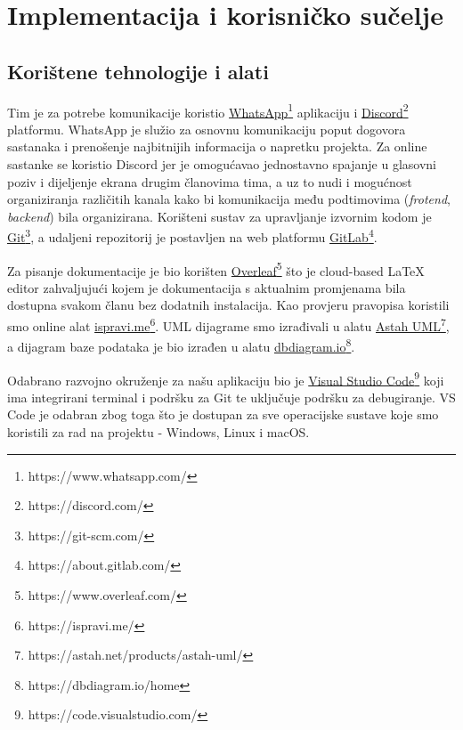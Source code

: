 \chapter{Implementacija i korisničko sučelje}
		
		
		\section{Korištene tehnologije i alati}
		
			 
			 Tim je za potrebe komunikacije koristio \underline{WhatsApp}\footnote{https://www.whatsapp.com/} aplikaciju i \underline{Discord}\footnote{https://discord.com/} platformu. WhatsApp je služio za osnovnu komunikaciju poput dogovora sastanaka i prenošenje najbitnijih informacija o napretku projekta. Za online sastanke se koristio Discord jer je omogućavao jednostavno spajanje u glasovni poziv i dijeljenje ekrana drugim članovima tima, a uz to nudi i mogućnost organiziranja različitih kanala kako bi komunikacija među podtimovima (\textit{frotend}, \textit{backend}) bila organizirana. Korišteni sustav za upravljanje izvornim kodom je \underline{Git}\footnote{https://git-scm.com/}, a udaljeni repozitorij je postavljen na web platformu \underline{GitLab}\footnote{https://about.gitlab.com/}. \par
			 
			 Za pisanje dokumentacije je bio korišten \underline{Overleaf}\footnote{https://www.overleaf.com/} što je cloud-based LaTeX editor zahvaljujući kojem je dokumentacija s aktualnim promjenama bila dostupna svakom članu bez dodatnih instalacija. Kao provjeru pravopisa koristili smo online alat \underline{ispravi.me}\footnote{https://ispravi.me/}. UML dijagrame smo izrađivali u alatu \underline{Astah UML}\footnote{https://astah.net/products/astah-uml/}, a dijagram baze podataka je bio izrađen u alatu \underline{dbdiagram.io}\footnote{https://dbdiagram.io/home}. \par
			 
			 Odabrano razvojno okruženje za našu aplikaciju bio je \underline{Visual Studio Code}\footnote{https://code.visualstudio.com/} koji ima integrirani terminal i podršku za Git te uključuje podršku za debugiranje. VS Code je odabran zbog toga što je dostupan za sve operacijske sustave koje smo koristili za rad na projektu - Windows, Linux i macOS. \par
			 
